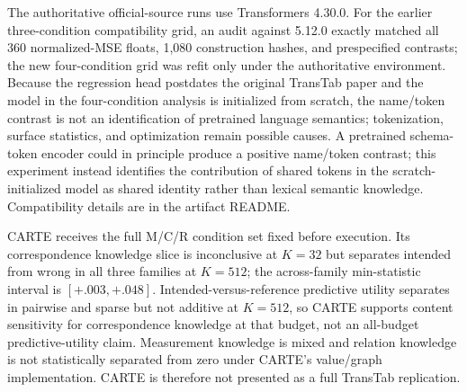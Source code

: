 The authoritative official-source runs use Transformers 4.30.0.  For the
earlier three-condition compatibility grid, an audit against 5.12.0 exactly matched
all 360 normalized-MSE floats, 1,080 construction hashes, and prespecified
contrasts; the new four-condition grid was refit only under the authoritative
environment.  Because the regression head postdates the
original TransTab paper and the model in the four-condition analysis is initialized from scratch,
the name/token contrast is not an identification of pretrained language
semantics; tokenization, surface statistics, and optimization remain possible
causes.  A pretrained schema-token encoder could in principle produce a
positive name/token contrast; this experiment instead identifies the
contribution of shared tokens in the scratch-initialized model as shared
identity rather than lexical semantic knowledge. Compatibility details are in the
artifact README.

CARTE receives the full M/C/R condition set fixed before execution. Its
correspondence knowledge slice is inconclusive at $K=32$ but separates intended from
wrong in all three
families at $K=512$; the across-family min-statistic interval is
$[+.003,+.048]$.  Intended-versus-reference predictive utility separates in
pairwise and sparse but not additive at $K=512$, so CARTE supports
content sensitivity for correspondence knowledge at that budget, not an all-budget
predictive-utility claim. Measurement knowledge is
mixed and relation knowledge is not statistically separated from zero under CARTE's
value/graph implementation. CARTE is therefore not presented as a full TransTab
replication.

